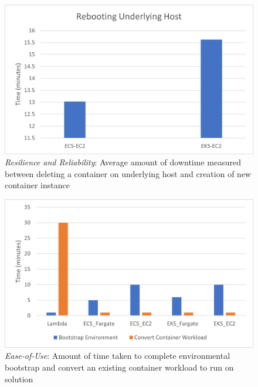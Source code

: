 \begin{figure}[hp]
  \includegraphics{images/rr-reboot.png}
  \caption{\emph{Resilience and Reliability}: Average amount of downtime measured between deleting a container on underlying host and creation of new container instance}
  \label{fig:rr_reboot}
\end{figure}

\begin{figure}[hp]
  \includegraphics{images/eou.png}
  \caption{\emph{Ease-of-Use}: Amount of time taken to complete environmental bootstrap and convert an existing container workload to run on solution}
  \label{fig:eou}
\end{figure}
